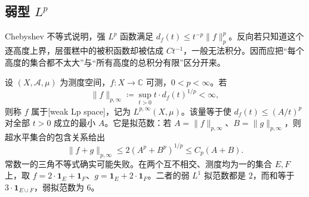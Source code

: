 \subsection{弱型 \texorpdfstring{\(L^p\)}{Lp}}
\label{b2:subsec:170202}

Chebyshev 不等式说明，强 \(L^p\) 函数满足 \(d_f(t)\leq t^{-p}\|f\|_p^p\)。反向若只知道这个逐高度上界，层蛋糕中的被积函数却被估成 \(Ct^{-1}\)，一般无法积分。因而应把“每个高度的集合都不太大”与“所有高度的总积分有限”区分开来。

\ProseParagraphBreak

设 \((X,\mathcal A,\mu)\) 为测度空间，\(f:X\to\mathbb C\) 可测，\(0<p<\infty\)。若
\[\|f\|_{p,\infty}\coloneqq\sup_{t>0}t\cdot d_f(t)^{1/p}<\infty,\]
则称 \(f\) 属于[weak Lp space]，记为 \(L^{p,\infty}(X,\mu)\)。该量等于使 \(d_f(t)\leq(A/t)^p\) 对全部 \(t>0\) 成立的最小 \(A\)。它是拟范数：若 \(A=\|f\|_{p,\infty}\)、\(B=\|g\|_{p,\infty}\)，则超水平集合的包含关系给出
\[\|f+g\|_{p,\infty}\leq2(A^p+B^p)^{1/p}\leq C_p(A+B).\]
常数一的三角不等式确实可能失败。在两个互不相交、测度均为一的集合 \(E,F\) 上，取 \(f=2\cdot\mathbf1_E+\mathbf1_F\)、\(g=\mathbf1_E+2\cdot\mathbf1_F\)。二者的弱 \(L^1\) 拟范数都是 \(2\)，而和等于 \(3\cdot\mathbf1_{E\cup F}\)，弱拟范数为 \(6\)。

